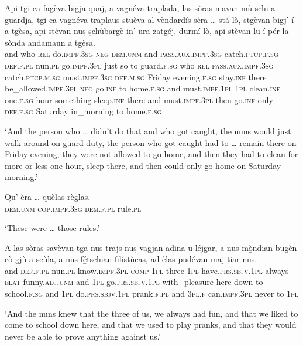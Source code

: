 \begin{linenumbers}
\gll    Api tgi ca fagèva bigja quaj, a vagnéva traplada, las sòras mavan mù schi a guardja, tgi ca vagnéva traplaus stuèva al vèndardís sèra … stá lò, stgèvan bigj’ í a tgèsa, api stèvan nuṣ ṣchùbargè in’ ura zatgéj, durmí lò, api stèvan lu í pér la sònda andamaun a tgèsa.\\
and who \textsc{rel} do.\textsc{impf.3sg} \textsc{neg} \textsc{dem.unm} and \textsc{pass.aux.impf.3sg} catch.\textsc{ptcp.f.sg} \textsc{def.f.pl} nun.\textsc{pl} go.\textsc{impf.3pl} just so to guard.\textsc{f.sg}  who \textsc{rel} \textsc{pass.aux.impf.3sg} catch.\textsc{ptcp.m.sg} must.\textsc{impf.3sg} \textsc{def.m.sg} Friday evening.\textsc{f.sg} {} stay.\textsc{inf} there be\_allowed.\textsc{impf.3pl} \textsc{neg} go.\textsc{inf} to home.\textsc{f.sg} and must.\textsc{impf.1pl} \textsc{1pl} clean.\textsc{inf} one.\textsc{f.sg} hour something sleep.\textsc{inf} there and must.\textsc{impf.3pl} then go.\textsc{inf} only \textsc{def.f.sg} Saturday in\_morning to home.\textsc{f.sg}\\
\end{linenumbers}
\medskip
\glt `And the person who … didn’t do that and who got caught, the nuns would just walk around on guard duty, the person who got caught had to … remain there on Friday evening, they were not allowed to go home, and then they had to clean for more or less one hour, sleep there, and then could only go home on Saturday morning.'
\medskip

\begin{linenumbers}
\gll    Qu’ èra … quèlas règlas.\\
 \textsc{dem.unm} \textsc{cop.impf.3sg} {} \textsc{dem.f.pl} rule.\textsc{pl}\\
\end{linenumbers}
\medskip
\glt `These were … those rules.'
\medskip

\begin{linenumbers}
\gll    A las sòras savèvan tga nus trajs nuṣ vagjan adina u-léjgar, a nus mò̱ndian bugèn cò gjù a scùla, a nus fé̱tschian filistùcas, ad èlas pudévan maj tiar nus.\\
and \textsc{def.f.pl} nun.\textsc{pl} know.\textsc{impf.3pl} \textsc{comp} \textsc{1pl} three \textsc{1pl} have.\textsc{prs.sbjv.1pl} always \textsc{elat}-funny.\textsc{adj.unm} and \textsc{1pl} go.\textsc{prs.sbjv.1pl} with\_pleasure here down to school.\textsc{f.sg} and \textsc{1pl} do.\textsc{prs.sbjv.1pl} prank.\textsc{f.pl} and \textsc{3pl.f} can.\textsc{impf.3pl} never to \textsc{1pl}\\
\end{linenumbers}
\medskip
\glt `And the nuns knew that the three of us, we always had fun, and that we liked to come to school down here, and that we used to play pranks, and that they would never be able to prove anything against us.'
\medskip

